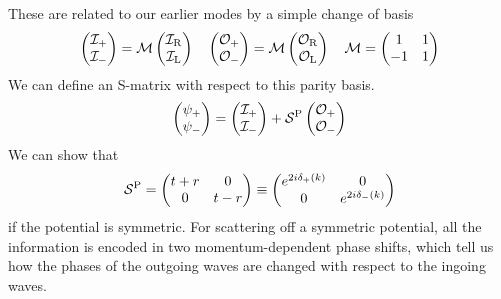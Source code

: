 These are related to our earlier modes by a simple change of basis
\[\begin{pmatrix}
\mathcal{I}_{+} \\ \mathcal{I}_{-}
\end{pmatrix} = \mathcal{M}\begin{pmatrix}
\mathcal{I}_{\rm R} \\ \mathcal{I}_{\rm L}
\end{pmatrix} \quad \begin{pmatrix}
\mathcal{O}_{+} \\ \mathcal{O}_{-}
\end{pmatrix} = \mathcal{M}\begin{pmatrix}
\mathcal{O}_{\rm R} \\ \mathcal{O}_{\rm L}
\end{pmatrix} \quad \mathcal{M} = \begin{pmatrix}
1 & 1 \\ -1 & 1
\end{pmatrix} \]
We can define an S-matrix with respect to this parity basis.
\[\begin{pmatrix} \psi_{+} \\ \psi_{-} \end{pmatrix} =  
\begin{pmatrix} \mathcal{I}_{+} \\ \mathcal{I}_{-} \end{pmatrix} + 
\mathcal{S}^{\rm P} \begin{pmatrix} \mathcal{O}_{+} \\ \mathcal{O}_{-} \end{pmatrix}\]
We can show that
\[\mathcal{S}^{\rm P} = \begin{pmatrix}
t + r & 0 \\ 0 & t - r
\end{pmatrix}  \equiv  \begin{pmatrix}
e^{2i\delta_+(k)} & 0 \\ 0 & e^{2i\delta_{-}(k)}
\end{pmatrix}\]
if the potential is symmetric. For scattering off a symmetric potential, all the information is encoded in two momentum-dependent phase shifts, which tell us how the phases of the outgoing waves are changed with respect to the ingoing waves.

